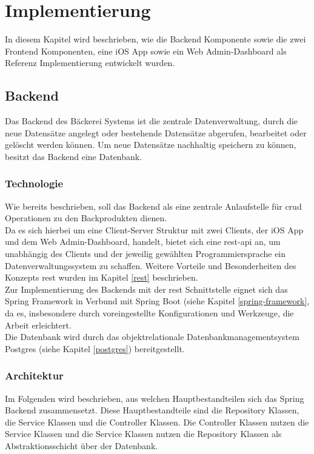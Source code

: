 \chapter{Implementierung}
In diesem Kapitel wird beschrieben, wie die Backend Komponente sowie die zwei Frontend Komponenten, eine iOS App sowie ein Web Admin-Dashboard als Referenz Implementierung entwickelt wurden. 

\section{Backend}
Das Backend des Bäckerei Systems ist die zentrale Datenverwaltung, durch die neue Datensätze angelegt oder bestehende Datensätze abgerufen, bearbeitet oder gelöscht werden können. Um neue Datensätze nachhaltig speichern zu können, besitzt das Backend eine Datenbank.

\subsection{Technologie}
Wie bereits beschrieben, soll das Backend als eine zentrale Anlaufstelle für \gls{crud} Operationen zu den Backprodukten dienen.
\\
Da es sich hierbei um eine Client-Server Struktur mit zwei Clients, der iOS App und dem Web Admin-Dashboard, handelt, bietet sich eine \gls{rest}-\gls{api} an, um unabhängig des Clients und der jeweilig gewählten Programmiersprache ein Datenverwaltungssystem zu schaffen. Weitere Vorteile und Besonderheiten des Konzepts \gls{rest} wurden im Kapitel \ref{rest} beschrieben. 
\\
Zur Implementierung des Backends mit der \gls{rest} Schnittstelle eignet sich das Spring Framework in Verbund mit Spring Boot (siehe Kapitel \ref{spring-framework}, da es, insbesondere durch voreingestellte Konfigurationen und Werkzeuge, die Arbeit erleichtert. 
\\
Die Datenbank wird durch das objektrelationale Datenbankmanagementsystem Postgres (siehe Kapitel \ref{postgres}) bereitgestellt.

\clearpage

\subsection{Architektur}
Im Folgenden wird beschrieben, aus welchen Hauptbestandteilen sich das Spring Backend zusammensetzt.
Diese Hauptbestandteile sind die Repository Klassen, die Service Klassen und die Controller Klassen.
Die Controller Klassen nutzen die Service Klassen und die Service Klassen nutzen die Repository Klassen als Abstraktionsschicht über der Datenbank.

